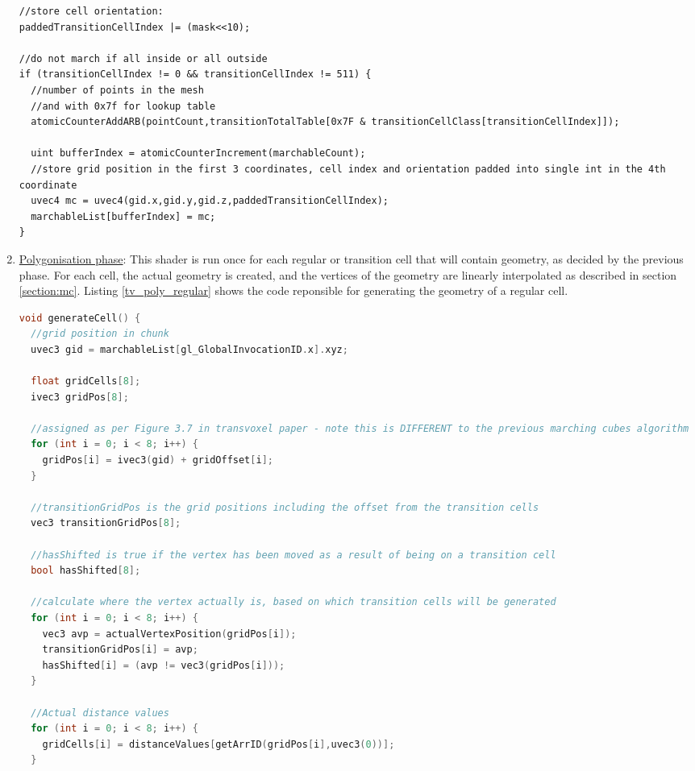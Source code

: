 \documentclass[11pt]{article}
\begin{document}
\begin{enumerate}
\begin{lstlisting}
//store cell orientation:
paddedTransitionCellIndex |= (mask<<10);

//do not march if all inside or all outside
if (transitionCellIndex != 0 && transitionCellIndex != 511) {
  //number of points in the mesh
  //and with 0x7f for lookup table
  atomicCounterAddARB(pointCount,transitionTotalTable[0x7F & transitionCellClass[transitionCellIndex]]);

  uint bufferIndex = atomicCounterIncrement(marchableCount);
  //store grid position in the first 3 coordinates, cell index and orientation padded into single int in the 4th coordinate
  uvec4 mc = uvec4(gid.x,gid.y,gid.z,paddedTransitionCellIndex);
  marchableList[bufferIndex] = mc;
}
\end{lstlisting}

\item \underline{Polygonisation phase}: This shader is run once for each regular or transition cell that will contain geometry, as decided by the previous phase. For each cell, the actual geometry is created, and the vertices of the geometry are linearly interpolated as described in section \ref{section:mc}. Listing \ref{tv_poly_regular} shows the code reponsible for generating the geometry of a regular cell.


\begin{lstlisting}[language=C++,label={tv_poly_regular},caption={Code for generating the geometry in a regular cell}]
void generateCell() {
  //grid position in chunk
  uvec3 gid = marchableList[gl_GlobalInvocationID.x].xyz;

  float gridCells[8];
  ivec3 gridPos[8];

  //assigned as per Figure 3.7 in transvoxel paper - note this is DIFFERENT to the previous marching cubes algorithm
  for (int i = 0; i < 8; i++) {
    gridPos[i] = ivec3(gid) + gridOffset[i];
  }

  //transitionGridPos is the grid positions including the offset from the transition cells
  vec3 transitionGridPos[8];

  //hasShifted is true if the vertex has been moved as a result of being on a transition cell
  bool hasShifted[8];

  //calculate where the vertex actually is, based on which transition cells will be generated
  for (int i = 0; i < 8; i++) {
    vec3 avp = actualVertexPosition(gridPos[i]);
    transitionGridPos[i] = avp;
    hasShifted[i] = (avp != vec3(gridPos[i]));
  }

  //Actual distance values
  for (int i = 0; i < 8; i++) {
    gridCells[i] = distanceValues[getArrID(gridPos[i],uvec3(0))];
  }


\end{lstlisting}
\end{enumerate}
\end{document}
